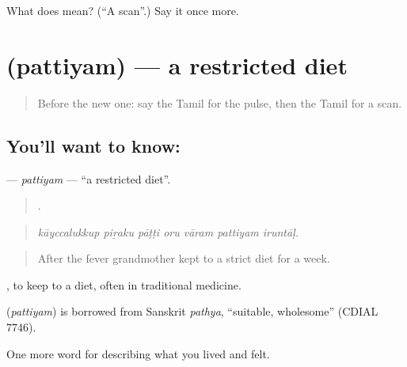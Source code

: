 \begin{tcolorbox}[breakable,colback=teal!4,colframe=teal!35!black,title={Before you move on}]
What does  mean? (\textquotedblleft{}A scan\textquotedblright{}.) Say it once more.
\end{tcolorbox}
\section[\texorpdfstring{\ta{பத்தியம்} (pattiyam)}{பத்தியம் (pattiyam)}]{ (pattiyam) — a restricted diet}

\label{lesson:TA-C475-pattiyam}



\begin{quote}
Before the new one: say the Tamil for the pulse, then the Tamil for a scan.
\end{quote}

\subsection*{You'll want to know: }
\textbf{} — \emph{pattiyam} — \textquotedblleft{}a restricted diet\textquotedblright{}.

\begin{quote}
      .
\end{quote}

\begin{quote}
\emph{kāyccalukkup piṟaku pāṭṭi oru vāram pattiyam iruntāḷ.}
\end{quote}

\begin{quote}
After the fever grandmother kept to a strict diet for a week.
\end{quote}

 , to keep to a diet, often in traditional medicine.

\begin{cousinweb}
\textbf{} (\emph{pattiyam}) is borrowed from Sanskrit \emph{pathya}, \textquotedblleft{}suitable, wholesome\textquotedblright{} (CDIAL 7746).
\end{cousinweb}

\begin{grammarlens}[title={What you've built}]
One more word for describing what you lived and felt.
\end{grammarlens}


